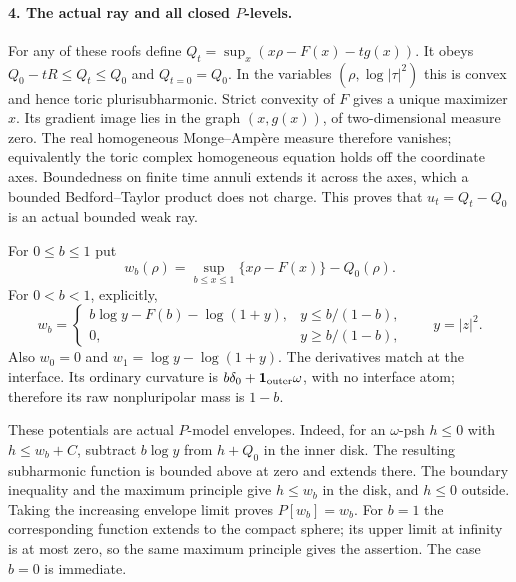 \documentclass[11pt]{article}
\begin{document}
\paragraph{4. The actual ray and all closed $P$-levels.}
For any of these roofs define $Q_t=\sup_x(x\rho-F(x)-tg(x))$.
It obeys $Q_0-tR\le Q_t\le Q_0$ and $Q_{t=0}=Q_0$.
In the variables $(\rho,\log|\tau|^2)$ this is convex and hence
toric plurisubharmonic. Strict convexity of $F$ gives a unique
maximizer $x$. Its gradient image lies in the graph $(x,g(x))$,
of two-dimensional measure zero. The real homogeneous
Monge--Amp\`ere measure therefore vanishes; equivalently the toric
complex homogeneous equation holds off the coordinate axes.
Boundedness on finite time annuli extends it across the axes,
which a bounded Bedford--Taylor product does not charge.
This proves that $u_t=Q_t-Q_0$ is an actual bounded weak ray.

For $0\le b\le1$ put
\[
 w_b(\rho)=\sup_{b\le x\le1}\{x\rho-F(x)\}-Q_0(\rho).
\]
For $0<b<1$, explicitly,
\[
 w_b=\begin{cases}
 b\log y-F(b)-\log(1+y),&y\le b/(1-b),\\
 0,&y\ge b/(1-b),
 \end{cases}\qquad y=|z|^2.                             \tag{8}
\]
Also $w_0=0$ and $w_1=\log y-\log(1+y)$.
The derivatives match at the interface. Its ordinary curvature
is $b\delta_0+\mathbf1_{\rm outer}\omega$, with no interface atom;
therefore its raw nonpluripolar mass is $1-b$.

These potentials are actual $P$-model envelopes. Indeed, for an
$\omega$-psh $h\le0$ with $h\le w_b+C$, subtract $b\log y$ from
$h+Q_0$ in the inner disk. The resulting subharmonic function is
bounded above at zero and extends there. The boundary inequality
and the maximum principle give $h\le w_b$ in the disk, and $h\le0$
outside. Taking the increasing envelope limit proves $P[w_b]=w_b$.
For $b=1$ the corresponding function extends to the compact sphere;
its upper limit at infinity is at most zero, so the same maximum
principle gives the assertion. The case $b=0$ is immediate.
\end{document}
